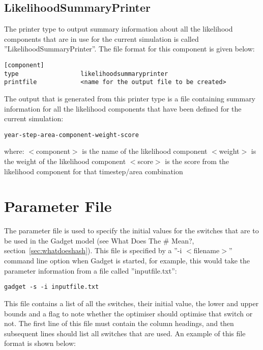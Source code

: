 \documentclass[10pt,twoside]{book}
\begin{document}
\section{LikelihoodSummaryPrinter}\label{sec:likelihoodsummaryprinter}
The printer type to output summary information about all the likelihood components that are in use for the current simulation is called ''LikelihoodSummaryPrinter''.  The file format for this component is given below:

{\small\begin{verbatim}
[component]
type                 likelihoodsummaryprinter
printfile            <name for the output file to be created>
\end{verbatim}}

The output that is generated from this printer type is a file containing summary information for all the likelihood components that have been defined for the current simulation:

{\small\begin{verbatim}
year-step-area-component-weight-score
\end{verbatim}}

where:\newline
$<$component$>$ is the name of the likelihood component\newline
$<$weight$>$ is the weight of the likelihood component\newline
$<$score$>$ is the score from the likelihood component for that timestep/area combination

\chapter{Parameter File}\label{chap:param}
The parameter file is used to specify the initial values for the switches that are to be used in the Gadget model (see What Does The \# Mean?, section~\ref{sec:whatdoeshash}).  This file is specified by a ''-i $<$filename$>$'' command line option when Gadget is started, for example, this would take the parameter information from a file called ''inputfile.txt'':

{\small\begin{verbatim}
gadget -s -i inputfile.txt
\end{verbatim}}

This file contains a list of all the switches, their initial value, the lower and upper bounds and a flag to note whether the optimiser should optimise that switch or not.  The first line of this file must contain the column headings, and then subsequent lines should list all switches that are used.  An example of this file format is shown below:
\end{document}
